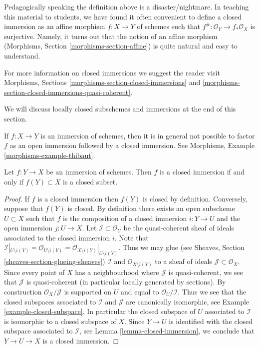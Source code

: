 \medskip\noindent
Pedagogically speaking the definition above is a disaster/nightmare.
In teaching this material to students, we have found it often
convenient to define a closed immersion as an affine morphism
$f : X \to Y$ of schemes such that $f^\# : \mathcal{O}_Y \to f_*\mathcal{O}_X$
is surjective. Namely, it turns out that the notion of an affine
morphism (Morphisms, Section \ref{morphisms-section-affine})
is quite natural and easy to understand.

\medskip\noindent
For more information on closed immersions we suggest the reader visit
Morphisms, Sections \ref{morphisms-section-closed-immersions} and
\ref{morphisms-section-closed-immersions-quasi-coherent}.

\medskip\noindent
We will discuss locally closed subschemes and immersions
at the end of this section.

\begin{remark}
\label{remark-not-reverse-open-closed}
If $f : X \to Y$ is an immersion of schemes, then it is in general
not possible to factor $f$ as an open immersion followed
by a closed immersion. See Morphisms, Example \ref{morphisms-example-thibaut}.
\end{remark}

\begin{lemma}
\label{lemma-immersion-when-closed}
Let $f : Y \to X$ be an immersion of schemes. Then $f$ is a closed
immersion if and only if $f(Y) \subset X$ is a closed subset.
\end{lemma}

\begin{proof}
If $f$ is a closed immersion then $f(Y)$ is closed by definition.
Conversely, suppose that $f(Y)$ is closed. By definition
there exists an open subscheme $U \subset X$ such that $f$ is the composition
of a closed immersion $i : Y \to U$ and the open immersion
$j : U \to X$. Let $\mathcal{I} \subset \mathcal{O}_U$ be the
quasi-coherent sheaf of ideals associated to the closed immersion
$i$. Note that
$\mathcal{I}|_{U \setminus i(Y)}
= \mathcal{O}_{U \setminus i(Y)}
= \mathcal{O}_{X \setminus i(Y)}|_{U \setminus i(Y)}$.
Thus we may glue (see Sheaves, Section \ref{sheaves-section-glueing-sheaves})
$\mathcal{I}$ and $\mathcal{O}_{X \setminus i(Y)}$ to a sheaf of
ideals $\mathcal{J} \subset \mathcal{O}_X$. Since every
point of $X$ has a neighbourhood where $\mathcal{J}$ is
quasi-coherent, we see that $\mathcal{J}$ is quasi-coherent
(in particular locally generated by sections).
By construction $\mathcal{O}_X/\mathcal{J}$ is supported
on $U$ and equal to $\mathcal{O}_U/\mathcal{I}$.
Thus we see that the closed subspaces associated to $\mathcal{I}$
and $\mathcal{J}$ are canonically isomorphic, see
Example \ref{example-closed-subspace}.
In particular the closed subspace of $U$ associated to $\mathcal{I}$
is isomorphic to a closed subspace of $X$.
Since $Y \to U$ is identified with the closed subspace
associated to $\mathcal{I}$, see Lemma \ref{lemma-closed-immersion},
we conclude that $Y \to U \to X$
is a closed immersion.
\end{proof}

